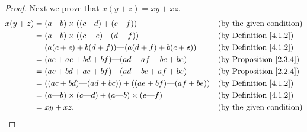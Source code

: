 \begin{proof}
    Next we prove that \(x(y + z) = xy + xz\).
    \begin{align*}
        x(y + z) & = (a \text{---} b) \times ((c \text{---} d) + (e \text{---} f))                       &  & \text{(by the given condition)}     \\
                 & = (a \text{---} b) \times ((c + e) \text{---} (d + f))                                &  & \text{(by Definition \ref{4.1.2})}  \\
                 & = (a(c + e) + b(d + f)) \text{---} (a(d + f) + b(c + e))                              &  & \text{(by Definition \ref{4.1.2})}  \\
                 & = (ac + ae + bd + bf) \text{---} (ad + af + bc + be)                                  &  & \text{(by Proposition \ref{2.3.4})} \\
                 & = (ac + bd + ae + bf) \text{---} (ad + bc + af + be)                                  &  & \text{(by Proposition \ref{2.2.4})} \\
                 & = ((ac + bd) \text{---} (ad + bc)) + ((ae + bf) \text{---} (af + be))                 &  & \text{(by Definition \ref{4.1.2})}  \\
                 & = (a \text{---} b) \times (c \text{---} d) + (a \text{---} b) \times (e \text{---} f) &  & \text{(by Definition \ref{4.1.2})}  \\
                 & = xy + xz.                                                                            &  & \text{(by the given condition)}
    \end{align*}


\end{proof}

